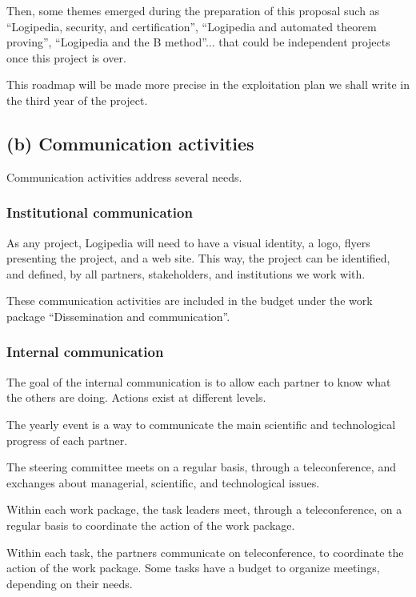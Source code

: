 Then, some themes emerged during the preparation of this proposal such
as ``Logipedia, security, and certification'', ``Logipedia and
automated theorem proving'', ``Logipedia and the B method''... that
could be independent projects once this project is over.

This roadmap will be made more precise in the exploitation plan
we shall write in the third year of the project.

\subsection*{(b) Communication activities}

Communication activities address several needs.

\subsubsection*{Institutional communication}

As any project, Logipedia will need to have a visual identity, a logo,
flyers presenting the project, and a web site.
This way, the project can be identified, and defined, by all partners,
stakeholders, and institutions we work with.

These communication activities are included in the budget under the
work package ``Dissemination and communication''.

\subsubsection*{Internal communication}

The goal of the internal communication is to allow each partner to
know what the others are doing. Actions exist at different levels.

\begin{compactitem}
\item The yearly event is a way to communicate the main scientific and
  technological progress of each partner.
\item The steering committee meets on a regular basis, through a
  teleconference, and exchanges about managerial, scientific, and
  technological issues.
\item Within each work package, the task leaders meet, through a
  teleconference, on a regular basis to coordinate the action of the
  work package.
\item Within each task, the partners communicate on teleconference, to
  coordinate the action of the work package. Some tasks have a budget
  to organize meetings, depending on their needs.
\end{compactitem}

